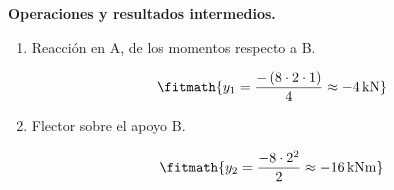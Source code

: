 \noindent\textbf{Operaciones y resultados intermedios.}

\begin{enumerate}

\item Reacción en A, de los momentos respecto a B.

\[\fitmath{y_{1}=\frac{-\left(8\cdot 2\cdot 1\right)}{4}\approx -4\,\mathrm{kN}}\]

\item Flector sobre el apoyo B.

\[\fitmath{y_{2}=\frac{-8\cdot {2}^{2}}{2}\approx -16\,\mathrm{kN m}}\]

\end{enumerate}
